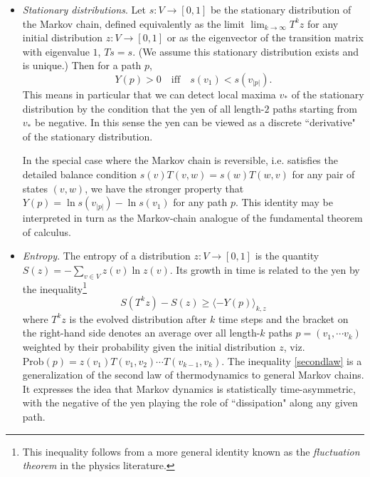 \documentclass[aps,prd,11pt,notitlepage,nofootinbib,superscriptaddress,showkeys,letterpaper]{revtex4-1}
\begin{document}
\begin{itemize}
        \item \textit{Stationary distributions}. Let $s:V\to[0,1]$ be the stationary distribution of the Markov chain, defined equivalently as the limit $\lim_{k\to\infty}T^kz$ for any initial distribution  $z:V\to[0,1]$ or as the eigenvector of the transition matrix with eigenvalue $1$, $Ts=s$. (We assume this stationary distribution exists and is unique.) Then for a path $p$,
        \begin{equation}
        Y(p)>0 \quad\textrm{iff}\quad s(v_1)<s(v_{\vert p\vert}).
        \end{equation}
        This means in particular that we can detect local maxima $v_*$
         of the stationary distribution by the condition that the yen of all length-$2$ paths starting from $v_*$ be negative. In this sense the yen can be viewed as a discrete ``derivative" of the stationary distribution. 
        
        In the special case where the Markov chain is reversible, i.e. satisfies the detailed balance condition $s(v)T(v,w)=s(w)T(w,v)$ for any pair of states $(v,w)$, we have the stronger property that 
        $Y(p)=\ln s(v_{\vert p\vert})-\ln s(v_1)$ for any path $p$. This identity may be interpreted in turn as the Markov-chain analogue of the fundamental theorem of calculus.  
        
        \item \textit{Entropy}. The entropy of a distribution $z:V\to[0,1]$ is the quantity $S(z)=-\sum_{v\in V} z(v)\ln z(v)$. Its growth in time is related to the yen by the inequality\footnote{This inequality follows from a more general identity known as the \textit{fluctuation theorem} in the physics literature.}
        \begin{equation}\label{secondlaw}
                S(T^k z)-S(z)\geq\langle-Y(p)\rangle_{k,z}
        \end{equation}
        where $T^kz$ is the evolved distribution after $k$ time steps and the bracket on the right-hand side denotes an average over all length-$k$ paths $p=(v_1,\cdots v_k)$ weighted by their probability given the initial distribution $z$, viz. $\textrm{Prob}(p)=z(v_1)T(v_1,v_2)\cdots T(v_{k-1},v_k)$. The inequality \eqref{secondlaw} is a generalization of the second law of thermodynamics to general Markov chains. It expresses the idea that Markov dynamics is statistically time-asymmetric, with the negative of the yen playing the role of ``dissipation" along any given path.
\end{itemize}
\end{document}
